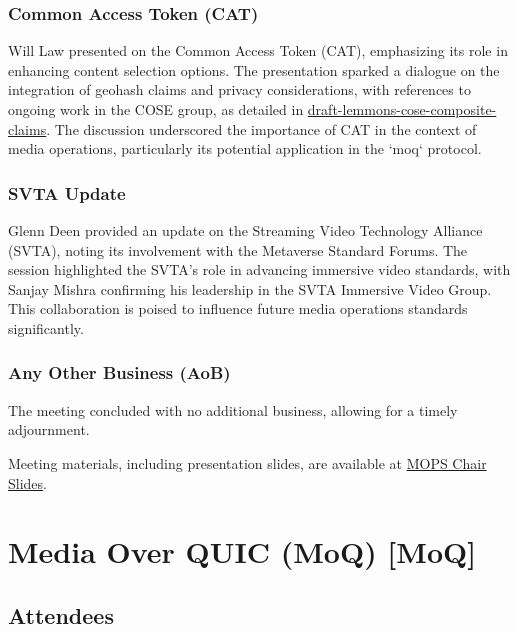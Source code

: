 \documentclass{article}
\begin{document}
\subsubsection{Common Access Token (CAT)}

Will Law presented on the Common Access Token (CAT), emphasizing its role in enhancing content selection options. The presentation sparked a dialogue on the integration of geohash claims and privacy considerations, with references to ongoing work in the COSE group, as detailed in \href{https://datatracker.ietf.org/doc/draft-lemmons-cose-composite-claims}{draft-lemmons-cose-composite-claims}. The discussion underscored the importance of CAT in the context of media operations, particularly its potential application in the `moq` protocol.

\subsubsection{SVTA Update}

Glenn Deen provided an update on the Streaming Video Technology Alliance (SVTA), noting its involvement with the Metaverse Standard Forums. The session highlighted the SVTA's role in advancing immersive video standards, with Sanjay Mishra confirming his leadership in the SVTA Immersive Video Group. This collaboration is poised to influence future media operations standards significantly.

\subsubsection{Any Other Business (AoB)}

The meeting concluded with no additional business, allowing for a timely adjournment.

Meeting materials, including presentation slides, are available at \href{https://datatracker.ietf.org/meeting/121/materials/slides-121-mops-mops-chair-slides-ietf-121-01}{MOPS Chair Slides}.




\newpage

\section{Media Over QUIC (MoQ) [MoQ]}

\subsection{Attendees}
\end{document}
